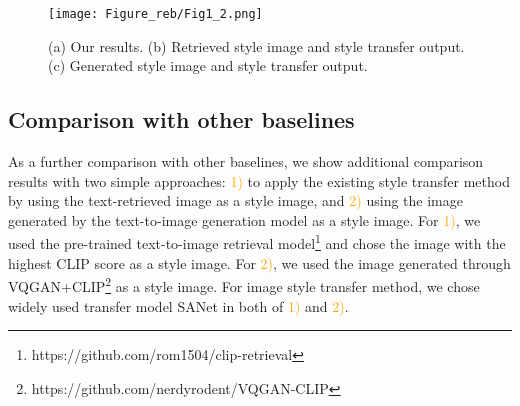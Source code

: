 \documentclass[10pt,twocolumn,letterpaper]{article}
\begin{document}
      
		



\begin{figure*}[!t]
\centering
\vspace{-0.3cm}
\texttt{[image: Figure\_reb/Fig1\_2.png]}
\vspace{-0.5cm}
\caption{(a) Our results. (b) Retrieved style image and style transfer output. (c) Generated style image and style transfer output.}
\vspace{-0.5cm}
\label{fig:reb1}
\end{figure*}


\subsection{Comparison with other baselines}
  As a further comparison with other baselines, we show additional comparison results with two simple approaches: \textcolor{orange}{1)} to apply the existing style transfer method by using the text-retrieved image as a style image, and \textcolor{orange}{2)} using the image generated by the text-to-image generation model as a style image. For \textcolor{orange}{1)}, we used the pre-trained text-to-image retrieval model\footnote{https://github.com/rom1504/clip-retrieval} and chose the image with the highest CLIP score as a style image. For \textcolor{orange}{2)}, we used the image generated through VQGAN+CLIP\footnote{https://github.com/nerdyrodent/VQGAN-CLIP} as a style image. For image style transfer method, we chose widely used transfer model SANet\cite{park} in both of \textcolor{orange}{1)} and \textcolor{orange}{2)}.
\end{document}
